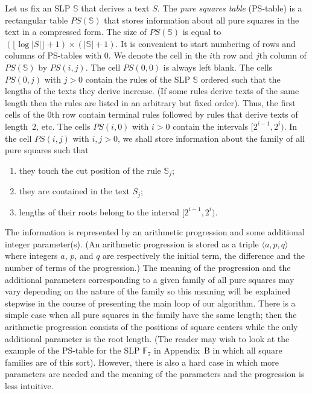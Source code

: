 \documentclass[11pt]{article}
\begin{document}
Let us fix an SLP $\mathbb{S}$ that derives a text $S$. The
\emph{pure squares table} (PS-table) is a rectangular table
$PS(\mathbb{S})$ that stores information about all pure squares in
the text in a compressed form. The size of $PS(\mathbb{S})$ is
equal to $(\lfloor\log |S|\rfloor+1) \times (|\mathbb{S}|+1)$. It
is convenient to start numbering of rows and columns of PS-tables
with 0. We denote the cell in the $i$th row and $j$th column of
$PS(\mathbb{S})$ by $PS(i,j)$. The cell $PS(0,0)$ is always left
blank. The cells $PS(0,j)$ with $j>0$ contain the rules of the SLP
$\mathbb{S}$ ordered such that the lengths of the texts they
derive increase. (If some rules derive texts of the same length
then the rules are listed in an arbitrary but fixed order). Thus,
the first cells of the 0th row contain terminal rules followed by
rules that derive texts of length~2, etc. The cells $PS(i,0)$ with
$i>0$ contain the intervals $[2^{i-1}, 2^i)$. In the cell $PS(i,
j)$ with $i,j>0$, we shall store information about the family of
all pure squares such that
\renewcommand{\labelenumi}{(\theenumi)}
\begin{enumerate}
\item they touch the cut position of the rule $\mathbb{S}_j$;
\item they are contained in the text $S_j$;
\item lengths of their roots belong to the interval $[2^{i-1}, 2^i)$.
\end{enumerate}
The information is represented by an arithmetic progression and
some additional integer parameter(s). (An arithmetic progression
is stored as a triple $\langle a, p, q\rangle$ where integers $a$,
$p$, and $q$ are respectively the initial term, the difference and
the number of terms of the progression.) The meaning of the
progression and the additional parameters corresponding to a given
family of all pure squares may vary depending on the nature of the
family so this meaning will be explained stepwise in the course of
presenting  the main loop of our algorithm. There is a simple case
when all pure squares in the family have the same length; then the
arithmetic progression consists of the positions of square centers
while the only additional parameter is the root length. (The
reader may wish to look at the example of the PS-table for the SLP
$\mathbb{F}_7$ in Appendix~B in which all square families are of
this sort). However, there is also a hard case in which more
parameters are needed and the meaning of the parameters and the
progression is less intuitive.
\end{document}
